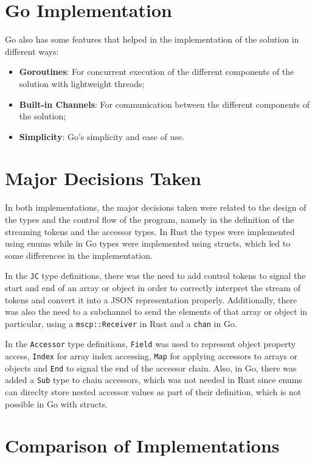 \documentclass[a4paper]{article}
\begin{document}
\section{Go Implementation}

Go also has some features that helped in the implementation of the solution in different ways:

\begin{itemize}
    \item \textbf{Goroutines}: For concurrent execution of the different components of the solution with lightweight threads;
    \item \textbf{Built-in Channels}: For communication between the different components of the solution;
    \item \textbf{Simplicity}: Go's simplicity and ease of use.
\end{itemize}

\section{Major Decisions Taken}

In both implementations, the major decisions taken were related to the design of the types and the control flow of the program, namely in the definition of the streaming tokens and the accessor types. In Rust the types were implemented using enums while in Go types were implemented using structs, which led to some differences in the implementation.

In the \texttt{JC} type definitions, there was the need to add control tokens to signal the start and end of an array or object in order to correctly interpret the stream of tokens and convert it into a JSON representation properly. Additionally, there was also the need to a subchannel to send the elements of that array or object in particular, using a \texttt{mscp::Receiver} in Rust and a \texttt{chan} in Go.

In the \texttt{Accessor} type definitions, \texttt{Field} was used to represent object property access, \texttt{Index} for array index accessing, \texttt{Map} for applying accessors to arrays or objects and \texttt{End} to signal the end of the accessor chain. Also, in Go, there was added a \texttt{Sub} type to chain accessors, which was not needed in Rust since enums can direclty store nested accessor values as part of their definition, which is not possible in Go with structs.

\section{Comparison of Implementations}
\end{document}

